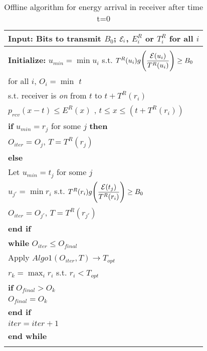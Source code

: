 \begin{table}
\begin{minipage}[b]{8cm}
\caption {Offline algorithm for energy arrival in receiver after time t=0}
\begin{tabular}{p{7cm}}
\hline \textbf{Input}: Bits to transmit $B_0$; $\mathcal{E}_i$, $E^R_i$ or $T^R_i$ for all $i$
\\
\hline
\\
\textbf{Initialize:} 
$u_{min}=\min u_i$ s.t. $T^R(u_i)g\Bigg{(} \dfrac{\mathcal{E}(u_i)}{T^R(u_i)}\Bigg{)}\ge B_0$
\\
for all $i$, $O_i=\min$ $t$
\\ 
s.t. receiver is \textit{on} from $t$ to $t+T^R(r_i)$ 
\\
\hspace{4mm}$p_{rcv}(x-t) \le E^R(x)$ ,  $t \le x\le (t+T^R(r_i))$ 
\\
\textbf{if} $u_{min}=r_j$ for some $j$  \textbf{then}
\\
\hspace{4mm}$O_{iter}=O_{j}$, $T=T^R(r_j)$
\\
\textbf{else}
\\
\hspace{4mm}Let $u_{min}=t_j$ for some $j$
\\
\hspace{4mm}$u_{j'}=\min r_i$ s.t. $T^R(r_i)g\Bigg{(} \dfrac{\mathcal{E}(t_j)}{T^R(r_i)}\Bigg{)}\ge B_0$
\\
\hspace{4mm}$O_{iter}=O_{j'}$, $T=T^R(r_{j'})$
\\
\textbf{end if}
\\
\textbf{while} $O_{iter}\le O_{final}$
\\
\hspace{4mm}Apply $Algo1(O_{iter} ,T)\rightarrow T_{opt}$
\\
\hspace{4mm}$r_k=\max_i r_i $ s.t. $r_i<T_{opt}$ 
\\
\hspace{4mm}\textbf{if} $O_{final} > O_{k}$
\\
\hspace{7mm}$O_{final} = O_{k}$
\\
\hspace{4mm}\textbf{end if}
\\
\hspace{4mm}$iter=iter+1$
\\
\textbf{end while}
\\
\hline
\label{online}
\end{tabular}
\end{minipage}
\end{table}
